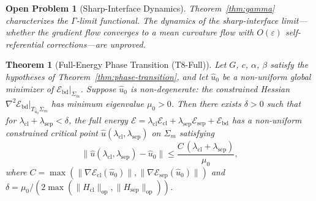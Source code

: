 \documentclass[lettersize,journal]{IEEEtran}
\newtheorem{theorem}{Theorem}
\newtheorem{openproblem}{Open Problem}
\begin{document}
\begin{openproblem}[Sharp-Interface Dynamics]
Theorem~\ref{thm:gamma} characterizes the $\Gamma$-limit functional. The dynamics of the sharp-interface limit---whether the gradient flow converges to a mean curvature flow with $O(\varepsilon)$ self-referential corrections---are unproved.
\end{openproblem}

\begin{theorem}[Full-Energy Phase Transition (T8-Full)]
\label{thm:full-phase-transition}
Let $G$, $c$, $\alpha$, $\beta$ satisfy the hypotheses of Theorem~\ref{thm:phase-transition}, and let $\hat{u}_0$ be a non-uniform global minimizer of $\mathcal{E}_{\mathrm{bd}}|_{\Sigma_m}$. Suppose $\hat{u}_0$ is non-degenerate: the constrained Hessian $\nabla^2\mathcal{E}_{\mathrm{bd}}|_{T_{\hat{u}_0}\Sigma_m}$ has minimum eigenvalue $\mu_0 > 0$. Then there exists $\delta > 0$ such that for $\lambda_{\mathrm{cl}} + \lambda_{\mathrm{sep}} < \delta$, the full energy $\mathcal{E} = \lambda_{\mathrm{cl}}\mathcal{E}_{\mathrm{cl}} + \lambda_{\mathrm{sep}}\mathcal{E}_{\mathrm{sep}} + \mathcal{E}_{\mathrm{bd}}$ has a non-uniform constrained critical point $\hat{u}(\lambda_{\mathrm{cl}}, \lambda_{\mathrm{sep}})$ on $\Sigma_m$ satisfying
\begin{equation}
\|\hat{u}(\lambda_{\mathrm{cl}}, \lambda_{\mathrm{sep}}) - \hat{u}_0\| \leq \frac{C\,(\lambda_{\mathrm{cl}} + \lambda_{\mathrm{sep}})}{\mu_0},
\end{equation}
where $C = \max(\|\nabla\mathcal{E}_{\mathrm{cl}}(\hat{u}_0)\|, \|\nabla\mathcal{E}_{\mathrm{sep}}(\hat{u}_0)\|)$ and $\delta = \mu_0 / (2\max(\|H_{\mathrm{cl}}\|_{\mathrm{op}}, \|H_{\mathrm{sep}}\|_{\mathrm{op}}))$.
\end{theorem}
\end{document}
